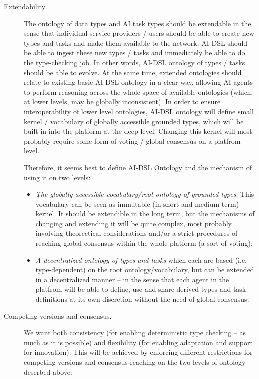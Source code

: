 \documentclass[]{report}
\begin{document}
\begin{description} \item[Extendability] The ontology of data types and AI task
types should be extendable in the sense that individual service providers /
users should be able to create new types and tasks and make them available to
the network. AI-DSL should be able to ingest these new types / tasks and
immediately be able to do the type-checking job. In other words, AI-DSL ontology
of types / tasks should be able to evolve. At the same time, extended ontologies
should relate to existing basic AI-DSL ontology in a clear way, allowing AI
agents to perform reasoning across the whole space of available ontologies
(which, at lower levels, may be globally inconsistent). In order to ensure
interoperability of lower level ontologies, AI-DSL ontology will define small
kernel / vocabulary of globally accessible grounded types, which will be
built-in into the platform at the deep level. Changing this kernel will most
probably require some form of voting / global consensus on a platfrom level.

  Therefore, it seems best to define AI-DSL Ontology and the mechanism of using
  it on two levels: \begin{itemize} \item \textit{The globally accessible
  vocabulary/root ontology of grounded types}. This vocabulary can be seen as
  immutable (in short and medium term) kernel. It should be extendible in the
  long term, but the mechanisms of changing and extending it will be quite
  complex, most probably involving theorectical considerations and/or a strict
  procedures of reaching global consensus within the whole platform (a sort of
  voting); \item \textit{A decentralized ontology of types and tasks} which each
  are based (i.e. type-dependent) on the root ontology/vocabulary, but can be
  extended in a decentralized manner -- in the sense that each agent in the
  platfrom will be able to define, use and share derived types and task
  definitions at its own discretion without the need of global consensus.
  \end{itemize}

  \item[Competing versions and consensus.] We want both consistency (for
  enabling deterministic type checking -- as much as it is possible) and
  flexibility (for enabling adaptation and support for innovation). This will be
  achieved by enforcing different restrictions for competing versions and
  consensus reaching on the two levels of ontology descrbed above:


\end{description}
\end{document}
